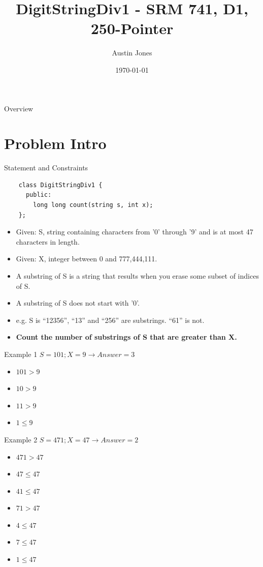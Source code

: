 \documentclass[10pt]{beamer}
\author{Austin Jones}
\title{DigitStringDiv1 \-- SRM 741, D1, 250-Pointer}
\date{\today}
\institute{University of Tennessee \-- Knoxville}
\begin{document}
\maketitle

\begin{frame}{Overview}
  \Large
  \tableofcontents[hideallsubsections]
\end{frame}

\section{Problem Intro}

\begin{frame}[fragile]{Statement and Constraints}
  \begin{verbatim}
    class DigitStringDiv1 {
      public:
        long long count(string s, int x);
    };
  \end{verbatim}
  \begin{itemize}
    \item Given: S, string containing characters from '0' through '9' and is at most 47 characters in length.
    \item Given: X, integer between 0 and 777,444,111.
    \item A substring of S is a string that results when you erase some subset of indices of S.
    \item A substring of S does not start with '0'.
    \item e.g. S is ``12356'', ``13'' and ``256'' are substrings. ``61'' is not.
    \item \textbf{Count the number of substrings of S that are greater than X.}
  \end{itemize}
\end{frame}

\begin{frame}{Example 1}
  \Large
  $S = 101; X = 9 \rightarrow Answer = 3$ \\
  \begin{itemize}[<+->]
    \item $101 > 9$ \only<5>{Here!}
    \item $10 > 9$  
    \item $11 > 9$  
    \item $1 \le 9$
  \end{itemize}
\end{frame}

\begin{frame}{Example 2}
  \Large
  $S = 471; X = 47 \rightarrow Answer = 2$ \\
  \begin{itemize}[<+->]
    \item $471 > 47$    
    \item $47 \le 47$   
    \item $41 \le 47$
    \item $71 > 47$     
    \item $4 \le 47$
    \item $7 \le 47$
    \item $1 \le 47$
  \end{itemize}
\end{frame}
\end{document}
